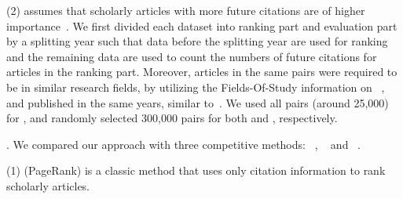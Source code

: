 \noindent
(2) \fcita assumes that scholarly articles with more future citations are of higher importance~\cite{Wang13AAAI,Wang16TIST,Li08TSRanking}.
We first divided each dataset into ranking part and evaluation part by a splitting year such that data before the splitting year are used for ranking and the remaining data are used to count the numbers of future citations for articles in the ranking part.
%
Moreover, articles in the same pairs were required to be in similar research fields, by utilizing the Fields-Of-Study information on \magdata~\cite{Sinha15:MAG}, and published in the same years, similar to~\cite{Wang16TIST}.
We used all pairs (around 25,000) for \aan, and randomly selected 300,000 pairs for both \aminer and \magdata, respectively.





.
We compared our approach \ensemblerank with three competitive methods: \pagerank~\cite{Brin98:PageRank}, \futurerank~\cite{sayyadi09} and \hhgrank~\cite{Liang16AAAI}.

\noindent
(1) \pagerank (PageRank) is a classic method that uses only citation information to rank scholarly articles.


